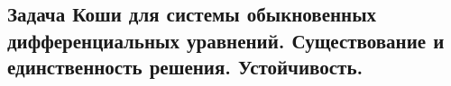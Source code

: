 \subsection{Задача Коши для системы обыкновенных дифференциальных уравнений. Существование и единственность решения. Устойчивость.}